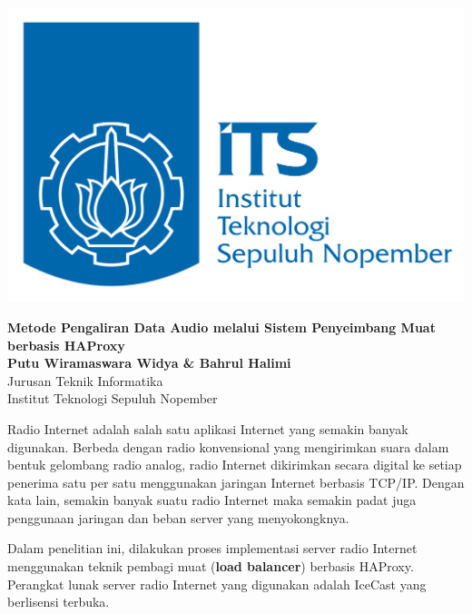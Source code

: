 \documentclass[a0,portrait]{a0poster}
\begin{document}
\begin{minipage}[b]{0.25\linewidth}
\includegraphics[width=\linewidth]{logo-its}
\end{minipage}
\begin{minipage}[b]{0.75\linewidth}

\veryHuge \color{NavyBlue} \textbf{Metode Pengaliran Data Audio melalui Sistem Penyeimbang Muat berbasis HAProxy} \\
\huge \color{black} \textbf{Putu Wiramaswara Widya \& Bahrul Halimi} \\
\Huge Jurusan Teknik Informatika \\
Institut Teknologi Sepuluh Nopember


\end{minipage}
\hline
\begin{multicols}{2}
\LARGE
\begin{tcolorbox}[colback=blue!5!white,colframe=blue!75!black,title=Pendahuluan]
Radio Internet adalah salah satu aplikasi Internet yang semakin banyak digunakan. Berbeda dengan radio konvensional yang mengirimkan suara dalam bentuk gelombang radio analog, radio Internet dikirimkan secara digital ke setiap penerima satu per satu menggunakan jaringan Internet berbasis TCP/IP. Dengan kata lain, semakin banyak suatu radio Internet maka semakin padat juga penggunaan jaringan dan beban server yang menyokongknya.

Dalam penelitian ini, dilakukan proses implementasi server radio Internet menggunakan teknik pembagi muat (\textbf{load balancer}) berbasis HAProxy. Perangkat lunak server radio Internet yang digunakan adalah IceCast yang berlisensi terbuka.
\end{tcolorbox}
\end{multicols}
\end{document}
